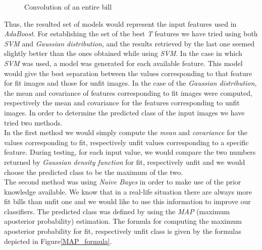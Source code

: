\documentclass[11pt,twocolumn]{article}
\begin{document}
\begin{figure}[!hbtp]
\centering
{}
\caption{Convolution of an entire bill}
\label{convolved}
\end{figure} 
Thus, the resulted set of models would represent the input features used in \emph{AdaBoost}. For establishing the set of the best \emph{T} features we have tried using both \emph{SVM} and \emph{Gaussian distribution}, and the results retrieved by the last one seemed slightly better than the ones obtained while using \emph{SVM}. In the case in which \emph{SVM} was used, a model was generated for each available feature. This model would give the best separation between the values corresponding to that feature for fit images and those for unfit images. In the case of the \emph{Gaussian distribution}, the mean and covariance of features corresponding to fit images were computed, respectively the mean and covariance for the features corresponding to unfit images. In order to determine the predicted class of the input images we have tried two methods.\\
\hspace*{10px}In the first method we would simply compute the \emph{mean} and \emph{covariance} for the values corresponding to fit, respectively unfit values corresponding to a specific feature. During testing, for each input value, we would compare the two numbers returned by \emph{Gaussian density function} for fit, respectively unfit and we would choose the predicted class to be the maximum of the two.\\  
\hspace*{10px}The second method was using \emph{Naive Bayes} in order to make use of the prior knowledge available. We know that in a real-life situation there are always more fit bills than unfit one and we would like to use this information to improve our classifiers. The predicted class was defined by using the \emph{MAP} (maximum aposterior probability) estimation. The formula for computing the maximum aposterior probability for fit, respectively unfit class is given by the formulas depicted in Figure\ref{MAP_formula}.\\
\end{document}
